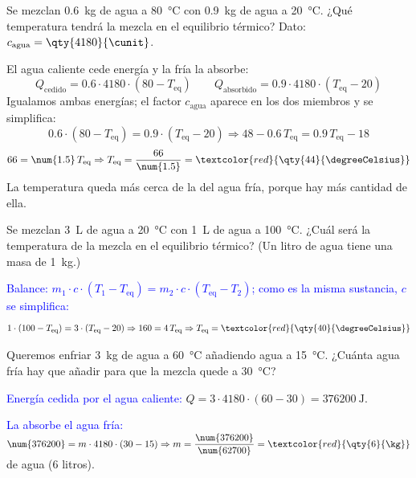 \begin{example}
    Se mezclan \qty{0.6}{\kg} de agua a \qty{80}{\degreeCelsius} con \qty{0.9}{\kg} de agua a \qty{20}{\degreeCelsius}. ¿Qué temperatura tendrá la mezcla en el equilibrio térmico? Dato: \(c_{\text{agua}} = \qty{4180}{\cunit}\).

    El agua caliente cede energía y la fría la absorbe:
    \[ Q_{\text{cedido}} = \num{0.6} \cdot 4180 \cdot (80 - T_{\text{eq}}) \qquad Q_{\text{absorbido}} = \num{0.9} \cdot 4180 \cdot (T_{\text{eq}} - 20) \]
    Igualamos ambas energías; el factor \(c_{\text{agua}}\) aparece en los dos miembros y se simplifica:
    \[ \num{0.6} \cdot (80 - T_{\text{eq}}) = \num{0.9} \cdot (T_{\text{eq}} - 20) \Rightarrow 48 - \num{0.6}\,T_{\text{eq}} = \num{0.9}\,T_{\text{eq}} - 18 \]
    \[ 66 = \num{1.5}\,T_{\text{eq}} \Rightarrow T_{\text{eq}} = \frac{66}{\num{1.5}} = \textcolor{red}{\qty{44}{\degreeCelsius}} \]
    La temperatura queda más cerca de la del agua fría, porque hay más cantidad de ella.
\end{example}

\begin{exercise}
    Se mezclan \qty{3}{\liter} de agua a \qty{20}{\degreeCelsius} con \qty{1}{\liter} de agua a \qty{100}{\degreeCelsius}. ¿Cuál será la temperatura de la mezcla en el equilibrio térmico? (Un litro de agua tiene una masa de \qty{1}{\kg}.)
    \begin{solu}
        \textcolor{blue}{Balance: \(m_1 \cdot c \cdot (T_1 - T_{\text{eq}}) = m_2 \cdot c \cdot (T_{\text{eq}} - T_2)\); como es la misma sustancia, \(c\) se simplifica:}
        \[ 1 \cdot (100 - T_{\text{eq}}) = 3 \cdot (T_{\text{eq}} - 20) \Rightarrow 160 = 4\,T_{\text{eq}} \Rightarrow T_{\text{eq}} = \textcolor{red}{\qty{40}{\degreeCelsius}} \]
    \end{solu}
\end{exercise}

\begin{exercise}
    Queremos enfriar \qty{3}{\kg} de agua a \qty{60}{\degreeCelsius} añadiendo agua a \qty{15}{\degreeCelsius}. ¿Cuánta agua fría hay que añadir para que la mezcla quede a \qty{30}{\degreeCelsius}?
    \begin{solu}
        \textcolor{blue}{Energía cedida por el agua caliente:} \(Q = 3 \cdot 4180 \cdot (60 - 30) = \qty{376200}{\joule}\).

        \textcolor{blue}{La absorbe el agua fría:} \(\num{376200} = m \cdot 4180 \cdot (30 - 15) \Rightarrow m = \dfrac{\num{376200}}{\num{62700}} = \textcolor{red}{\qty{6}{\kg}}\) de agua (6 litros).
    \end{solu}
\end{exercise}

